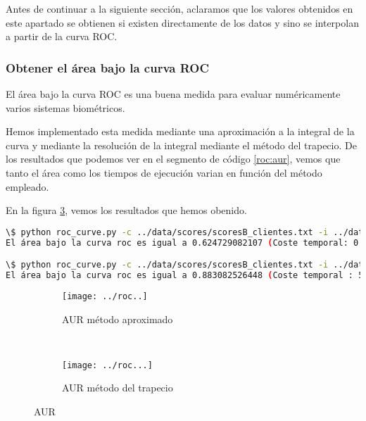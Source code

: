 Antes de continuar a la siguiente sección, aclaramos que los valores obtenidos en este apartado se obtienen si existen directamente de los datos y sino se interpolan a partir de la curva ROC.\par

\subsubsection{Obtener el área bajo la curva ROC}

El área bajo la curva ROC es una buena medida para evaluar numéricamente varios sistemas biométricos.\par
Hemos implementado esta medida mediante una aproximación a la integral de la curva y mediante la resolución de la integral mediante el método del trapecio. De los resultados que podemos ver en el segmento de código \ref{roc:aur}, vemos que tanto el área como los tiempos de ejecución varian en función del método empleado.\par
En la figura \ref{fig:aur}, vemos los resultados que hemos obenido.

\begin{lstlisting}[language=bash,label=roc:aur,caption=Calculo del área bajo la curva ROC para sistemas biométricos]
\$ python roc_curve.py -c ../data/scores/scoresB_clientes.txt -i ../data/scores/scoresB_impostores.txt  -a       
El área bajo la curva roc es igual a 0.624729082107 (Coste temporal: 0.000113964080811)

\$ python roc_curve.py -c ../data/scores/scoresB_clientes.txt -i ../data/scores/scoresB_impostores.txt  -aA
El área bajo la curva roc es igual a 0.883082526448 (Coste temporal : 5.70780491829)
\end{lstlisting}

\begin{figure}[ht]
    \centering
        \begin{subfigure}[b]{0.5\textwidth}
                \centering
                \texttt{[image: ../roc..]}
                \caption{AUR método aproximado}
                \label{fig:aurAprox}
        \end{subfigure}%
        ~ 
        \begin{subfigure}[b]{0.5\textwidth}
                \centering
                \texttt{[image: ../roc...]}
                \caption{AUR método del trapecio}
                \label{fig:aurTrap}
        \end{subfigure}
    \caption{AUR}\label{fig:aur}
\end{figure}


